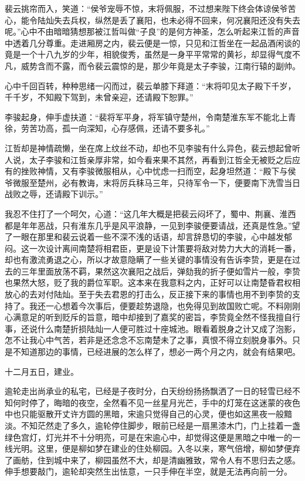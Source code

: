 裴云挑帘而入，笑道：“侯爷宠辱不惊，末将佩服，不过想来陛下终会体谅侯爷苦心，能令陆灿失去兵权，纵然是丢了襄阳，也未必得不回来，何况襄阳还没有失去呢。”心中不由暗暗猜想那被江哲叫做“子良”的是何方神圣，怎么听起来江哲的声音中透着几分尊重。走进厢房之内，裴云便是一惊，只见和江哲坐在一起品酒闲谈的竟是一个十八九岁的少年，相貌俊秀，虽然是一身平平常常的黄衫，却显得气度不凡，威势含而不露，而令裴云震惊的是，那少年竟是太子李骏，江南行辕的副帅。

心中千回百转，种种思绪一闪而过，裴云单膝下拜道：“末将叩见太子殿下千岁，千千岁，不知殿下驾到，未曾亲迎，还请殿下恕罪。”

李骏起身，伸手虚扶道：“裴将军平身，将军镇守楚州，令南楚淮东军不能北上青徐，劳苦功高，孤一向深知，心存感佩，还请不要多礼。”

江哲却是神情疏懒，坐在席上纹丝不动，却也不见李骏有什么异色，裴云想起曾听人说，太子李骏和江哲亲厚非常，如今看来果不其然，再看到江哲全无被贬之后应有的挫败神情，又有李骏微服相从，心中忧虑一扫而空，起身坦然道：“殿下与侯爷微服至楚州，必有教诲，末将厉兵秣马三年，只待军令一下，便要南下洗雪当日战败之辱，还请殿下训示。”

我忍不住打了一个呵欠，心道：“这几年大概是把裴云闷坏了，蜀中、荆襄、淮西都是年年恶战，只有淮东几乎是风平浪静，一见到李骏便要请战，还真是性急。”望了一眼在那里和裴云说着一些不深不浅的话语，却言辞恳切的李骏，心中越发郁闷。这一次设计离间南楚将相君臣，更是设下计策要将敌对势力大大的消耗一番，却也有激流勇退之心，所以才故意隐瞒了一些关键的事情没有告诉李贽，更是在过去的三年里面放荡不羁，果然这次襄阳之战后，弹劾我的折子便如雪片一般，李贽也果然大怒，贬了我的爵位军职。这本来在我意料之内，正好可以让南楚昏君权相放心的去对付陆灿。至于失去君恩的打击么，反正接下来的事情也用不到李贽的支持了。我还一心想着今次事后，便要趁势退隐，也免得见到故国败亡呢。不料刚刚心满意足的听到贬斥的旨意，暗中却接到了嘉奖的密旨，李贽竟全然不怪我擅自行事，还说什么南楚折损陆灿一人便可胜过十座城池。眼看着脱身之计又成了泡影，怎不让我心中气苦，若非是还念念不忘南楚未了之事，真恨不得立刻脱身事外。只是不知道那边的事情，已经进展的怎么样了，想必一两个月之内，就会有结果吧。

十二月五日，建业。

逾轮走出尚承业的私宅，已经是子夜时分，白天纷纷扬扬飘洒了一日的轻雪已经不知何时停了，晦暗的夜空，全然看不见一丝星月光芒，手中的灯笼在这迷蒙的夜色中也只能驱散开丈许方圆的黑暗，宋逾只觉得自己的心灵，便也如这黑夜一般黯淡。不知茫然走了多久，逾轮停住脚步，眼前已经是一扇黑漆木门，门上挂着一盏绿色宫灯，灯光并不十分明亮，可是在宋逾心中，却觉得这便是黑暗之中唯一的一线光明。这里，便是柳如梦在建业的住处柳园。入冬以来，寒气倍增，柳如梦便弃了画舫，住到城中来了，柳园虽然不大，却是清幽雅致，常令人有不思归去之感。伸手想要敲门，逾轮却突然生出怯意，一只手伸在半空，就是无法再向前一分。

